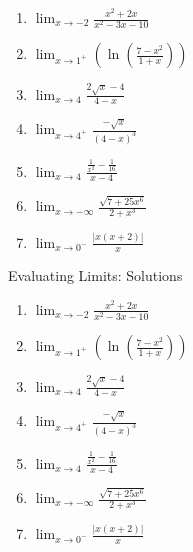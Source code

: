 \documentclass[12pt]{article}
\let\d\displaystyle
\begin{document}
\begin{enumerate}
\item  $\d \lim_{x \to -2} \frac{x^2 + 2x}{x^2 - 3x - 10}$
\vfill
\item  $\d \lim_{x \to 1^+} \left( \ln \left( \frac{ 7 - x^2}{1+x} \right)\right)$
\vfill

\item  $\d \lim_{x \to 4} \frac{2\sqrt{x}-4}{4-x}$
\vfill
\item  $\d \lim_{x \to 4^+} \frac{-\sqrt x}{(4-x)^3}$
\vfill
\item  $\d \lim_{x \to 4} \frac{ \frac 1{x^2} - \frac 1 {16}}{x-4}$
\vfill

\item  $ \d \lim_{x \to - \infty} \frac{\sqrt{7 + 25x^6}}{2+x^3}$
\vfill
\item  $ \d \lim_{x \to 0^-} \frac{|x(x+2)|}{x}$
\vfill
\end{enumerate}	
\newpage
\begin{center} Evaluating Limits: Solutions \end{center}

\begin{enumerate}
\item  $\d \lim_{x \to -2} \frac{x^2 + 2x}{x^2 - 3x - 10}$
\vfill
\item  $\d \lim_{x \to 1^+} \left( \ln \left( \frac{ 7 - x^2}{1+x} \right)\right)$
\vfill

\item  $\d \lim_{x \to 4} \frac{2\sqrt{x}-4}{4-x}$
\vfill
\item  $\d \lim_{x \to 4^+} \frac{-\sqrt x}{(4-x)^3}$
\vfill
\item  $\d \lim_{x \to 4} \frac{ \frac 1{x^2} - \frac 1 {16}}{x-4}$
\vfill

\item  $ \d \lim_{x \to - \infty} \frac{\sqrt{7 + 25x^6}}{2+x^3}$
\vfill
\item  $ \d \lim_{x \to 0^-} \frac{|x(x+2)|}{x}$
\vfill
\end{enumerate}	
\end{document}
